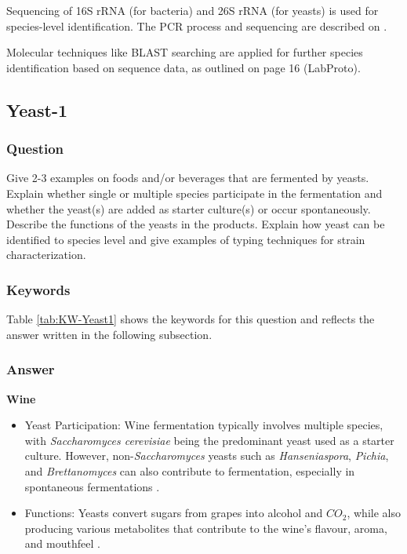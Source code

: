 Sequencing of 16S rRNA (for bacteria) and 26S rRNA (for yeasts) is used for species-level identification. The PCR process and sequencing are described on \cite*{LabManual}.

Molecular techniques like BLAST searching are applied for further species identification based on sequence data, as outlined on page 16 (LabProto).

\subsection{Yeast-1}
\subsubsection*{Question}
Give 2-3 examples on foods and/or beverages that are fermented by yeasts. Explain whether single or multiple species participate in the fermentation and whether the yeast(s) are added as starter culture(s) or occur spontaneously. Describe the functions of the yeasts in the products. Explain how yeast can be identified to species level and give examples of typing techniques for strain characterization. 

\subsubsection*{Keywords}
Table \ref{tab:KW-Yeast1} shows the keywords for this question and reflects the answer written in the following subsection.

\subsubsection*{Answer}
\textbf{Wine}
\begin{itemize}
    \item Yeast Participation: Wine fermentation typically involves multiple species, with \textit{Saccharomyces cerevisiae} being the predominant yeast used as a starter culture. However, non-\textit{Saccharomyces} yeasts such as \textit{Hanseniaspora}, \textit{Pichia}, and \textit{Brettanomyces} can also contribute to fermentation, especially in spontaneous fermentations \cite*{L9-ISAPP}.
    \item Functions: Yeasts convert sugars from grapes into alcohol and $CO_2$, while also producing various metabolites that contribute to the wine's flavour, aroma, and mouthfeel \cite*{L6-Yeasts,L9-ISAPP}.
\end{itemize}

